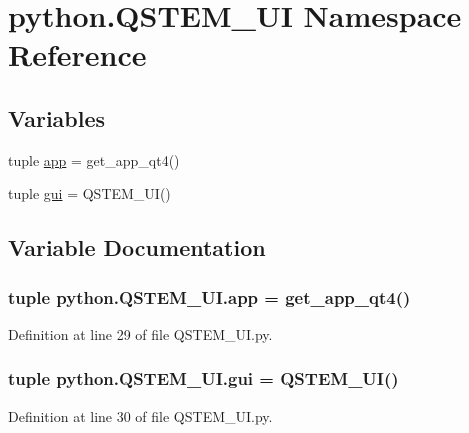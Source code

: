 \hypertarget{namespacepython_1_1_q_s_t_e_m___u_i}{\section{python.\-Q\-S\-T\-E\-M\-\_\-\-U\-I Namespace Reference}
\label{namespacepython_1_1_q_s_t_e_m___u_i}
}
\subsection*{Variables}
\begin{DoxyCompactItemize}
\item 
tuple \hyperlink{namespacepython_1_1_q_s_t_e_m___u_i_a30e4b7b05262802f54d98df8f19504d9}{app} = get\-\_\-app\-\_\-qt4()
\item 
tuple \hyperlink{namespacepython_1_1_q_s_t_e_m___u_i_aac7eb46e57aeaf682ed4fea60720ba00}{gui} = Q\-S\-T\-E\-M\-\_\-\-U\-I()
\end{DoxyCompactItemize}


\subsection{Variable Documentation}
\hypertarget{namespacepython_1_1_q_s_t_e_m___u_i_a30e4b7b05262802f54d98df8f19504d9}{
\subsubsection[{app}]{\setlength{\rightskip}{0pt plus 5cm}tuple python.\-Q\-S\-T\-E\-M\-\_\-\-U\-I.\-app = get\-\_\-app\-\_\-qt4()}}\label{namespacepython_1_1_q_s_t_e_m___u_i_a30e4b7b05262802f54d98df8f19504d9}


Definition at line 29 of file Q\-S\-T\-E\-M\-\_\-\-U\-I.\-py.

\hypertarget{namespacepython_1_1_q_s_t_e_m___u_i_aac7eb46e57aeaf682ed4fea60720ba00}{
\subsubsection[{gui}]{\setlength{\rightskip}{0pt plus 5cm}tuple python.\-Q\-S\-T\-E\-M\-\_\-\-U\-I.\-gui = Q\-S\-T\-E\-M\-\_\-\-U\-I()}}\label{namespacepython_1_1_q_s_t_e_m___u_i_aac7eb46e57aeaf682ed4fea60720ba00}


Definition at line 30 of file Q\-S\-T\-E\-M\-\_\-\-U\-I.\-py.

